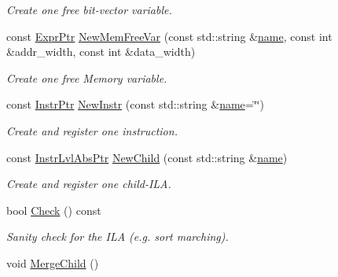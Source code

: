 \begin{DoxyCompactItemize}
\begin{DoxyCompactList}\small\item\em Create one free bit-\/vector variable. \end{DoxyCompactList}\item 
const \mbox{\hyperlink{namespaceilang_a7c4196c72e53ea4df4b7861af7bc3bce}{Expr\+Ptr}} \mbox{\hyperlink{classilang_1_1_instr_lvl_abs_a7f87a7520508c0a77c1b7a5012d70e95}{New\+Mem\+Free\+Var}} (const std\+::string \&\mbox{\hyperlink{classilang_1_1_object_acf20b072e69f572910d7d80c93af0b38}{name}}, const int \&addr\+\_\+width, const int \&data\+\_\+width)
\begin{DoxyCompactList}\small\item\em Create one free Memory variable. \end{DoxyCompactList}\item 
const \mbox{\hyperlink{namespaceilang_af88a19312ae653d687a0d1207bb284f6}{Instr\+Ptr}} \mbox{\hyperlink{classilang_1_1_instr_lvl_abs_ac080f6d1dfa33cf5cb06d51a38b7bf3c}{New\+Instr}} (const std\+::string \&\mbox{\hyperlink{classilang_1_1_object_acf20b072e69f572910d7d80c93af0b38}{name}}=\char`\"{}\char`\"{})
\begin{DoxyCompactList}\small\item\em Create and register one instruction. \end{DoxyCompactList}\item 
const \mbox{\hyperlink{classilang_1_1_instr_lvl_abs_a743fd98e5ad145d70cb0dabf8db0007c}{Instr\+Lvl\+Abs\+Ptr}} \mbox{\hyperlink{classilang_1_1_instr_lvl_abs_a1ef924bf341b57eb7a1bdb22444d353b}{New\+Child}} (const std\+::string \&\mbox{\hyperlink{classilang_1_1_object_acf20b072e69f572910d7d80c93af0b38}{name}})
\begin{DoxyCompactList}\small\item\em Create and register one child-\/\+I\+LA. \end{DoxyCompactList}\item 
bool \mbox{\hyperlink{classilang_1_1_instr_lvl_abs_a888c4e60c93c65ee3a711dde7be6af61}{Check}} () const
\begin{DoxyCompactList}\small\item\em Sanity check for the I\+LA (e.\+g. sort marching). \end{DoxyCompactList}\item 
\mbox{\label{classilang_1_1_instr_lvl_abs_a00762ec13acf1c062525322ca4640bda}} 
void \mbox{\hyperlink{classilang_1_1_instr_lvl_abs_a00762ec13acf1c062525322ca4640bda}{Merge\+Child}} ()

\end{DoxyCompactItemize}
